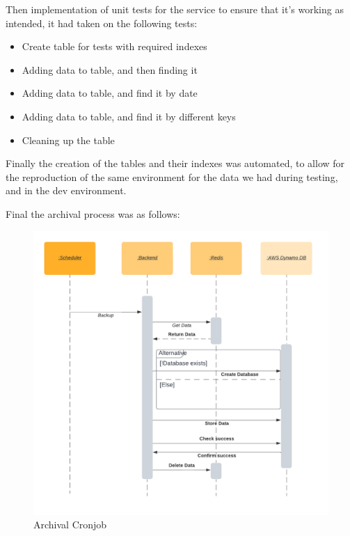 Then implementation of unit tests for the service to ensure that it's working as intended,
it had taken on the following tests:

    \begin{itemize}
        \item Create table for tests with required indexes
        \item Adding data to table, and then finding it
        \item Adding data to table, and find it by date
        \item Adding data to table, and find it by different keys
        \item Cleaning up the table
    \end{itemize}

Finally the creation of the tables and their indexes was automated, to allow for the
reproduction of the same environment for the data we had during testing, and in the 
dev environment.

\newpage

Final the archival process was as follows:
\begin{figure}[!htbp]
    \centering
    \includegraphics[width=\textwidth]{images/archival_backup.png} 
    \caption{\footnotesize{Archival Cronjob}}
    \label{fig:archival_backup}
\end{figure}

